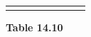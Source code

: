 \begin{center}
\begin{xtabular*}{\mytablewidth}[t]{|p{10\mystarwidth}|p{10\mystarwidth}|p{10\mystarwidth}|p{10\mystarwidth}|p{10\mystarwidth}|p{10\mystarwidth}|p{10\mystarwidth}|p{10\mystarwidth}|}
{    \addtocounter{footnote}{-0}
    
                }
     \tabularnewline{}
    \end{xtabular*}
      \end{center}
    \begin{center}{\small\bfseries Table 14.10}\end{center}
    
    \addtocounter{footnote}{-0}
    
    \par
  
        
        
        

